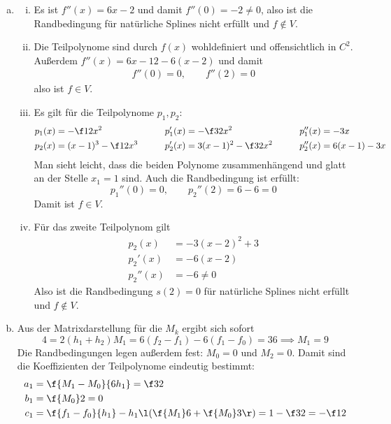 \documentclass{mywork}
\begin{document}
\begin{aufgabe}
	\begin{enumerate}[a)]
		\item
			\begin{enumerate}[i)]
				\item
					Es ist $f''(x) = 6x-2$ und damit $f''(0) = -2 \neq 0$, also ist die Randbedingung für natürliche Splines nicht erfüllt und $f\not\in V$.
				\item
					Die Teilpolynome sind durch $f(x)$ wohldefiniert und offensichtlich in $C^2$.
					Außerdem $f''(x) = 6x-12 - 6(x-2)$ und damit
					\begin{align*}
						f''(0) = 0, \qquad	f''(2) = 0
					\end{align*}
					also ist $f\in V$.
				\item
					Es gilt für die Teilpolynome $p_1,p_2$:
					\begin{alignat*}{3}
						p_1(x) &= -\f 12 x^2 & \qquad p_1'(x) &= -\f 32 x^2 & \qquad p_1''(x) &= -3x \\
						p_2(x) &= (x-1)^3 - \f 12 x^3&  \qquad p_2'(x) &= 3(x-1)^2 - \f 32 x^2 & \qquad p_2''(x) &= 6(x-1) -3x
					\end{alignat*}
					Man sieht leicht, dass die beiden Polynome zusammenhängend und glatt an der Stelle $x_1=1$ sind.
					Auch die Randbedingung ist erfüllt:
					\[
						p_1''(0) = 0, \qquad p_2''(2) = 6 - 6 = 0
					\]
					Damit ist $f\in V$.
				\item
					Für das zweite Teilpolynom gilt 
					\begin{align*}
						p_2(x) &= -3(x-2)^2+3 \\
						p_2'(x) &= -6(x-2) \\
						p_2''(x) &= -6 \neq 0
					\end{align*}
					Also ist die Randbedingung $s(2)=0$ für natürliche Splines nicht erfüllt und $f\not\in V$.
			\end{enumerate}
		\item
			Aus der Matrixdarstellung für die $M_k$ ergibt sich sofort
			\[
				4 = 2(h_1+h_2) M_1 = 6(f_2 - f_1) - 6(f_1 - f_0) = 36 \implies M_1 = 9
			\]
			Die Randbedingungen legen außerdem fest: $M_0=0$ und $M_2=0$.
			Damit sind die Koeffizienten der Teilpolynome eindeutig bestimmt:
			\begin{align*}
				a_1 &= \f {M_1-M_0}{6h_1} = \f 32 \\
				b_1 &= \f {M_0}2 = 0 \\
				c_1 &= \f {f_1 - f_0}{h_1} - h_1\l(\f {M_1}6 + \f {M_0}3\r) = 1 - \f 32 = -\f 12 \\

\end{align*}
\end{enumerate}
\end{aufgabe}
\end{document}
